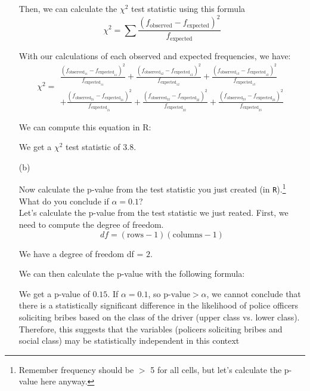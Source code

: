 \documentclass[12pt,letterpaper]{article}
\begin{document}
\begin{enumerate}
	 Then, we can calculate the $\chi^2$ test statistic using this formula
	 \[
	 \chi^2 = \sum \frac{(f_{\text{observed}} - f_{\text{expected}})^2}{f_{\text{expected}}}
	 \]
	 
	
	With our calculations of each observed and expected frequencies, we have:
	\[
	\chi^2 = 
	\begin{split}
		\frac{(f_{\text{observed}_{11}} - f_{\text{expected}_{11}})^2}{f_{\text{expected}_{11}}} 
		+ \frac{(f_{\text{observed}_{12}} - f_{\text{expected}_{12}})^2}{f_{\text{expected}_{12}}} 
		+ \frac{(f_{\text{observed}_{13}} - f_{\text{expected}_{13}})^2}{f_{\text{expected}_{13}}} \\
		+ \frac{(f_{\text{observed}_{21}} - f_{\text{expected}_{21}})^2}{f_{\text{expected}_{21}}} 
		+ \frac{(f_{\text{observed}_{22}} - f_{\text{expected}_{22}})^2}{f_{\text{expected}_{22}}} 
		+ \frac{(f_{\text{observed}_{23}} - f_{\text{expected}_{23}})^2}{f_{\text{expected}_{23}}} 
	\end{split}
	\]
	

	 We can compute this equation in R:
	 
	 
	 We get a  $\chi^2$ test statistic of  \(3.8\). 
	
	\vspace{1cm}
	\item [(b)]
	
	Now calculate the p-value from the test statistic you just created (in \texttt{R}).\footnote{Remember frequency should be $>$ 5 for all cells, but let's calculate the p-value here anyway.}  What do you conclude if $\alpha = 0.1$?\\
	
	Let's calculate the p-value from the test statistic we just reated.
	First, we need to compute the degree of freedom.
	\[
	df = (\text{rows} - 1)(\text{columns} - 1)
	\]
	

	
	We have a degree of freedom df = \(2\).
	
		
	We can then calculate the p-value with the following formula:
	

	
	We get a p-value of  \(0.15\). If  \(\alpha = 0.1\), so \( \text{p-value} > \alpha \), we cannot conclude that there is a statistically significant difference in the likelihood of police officers soliciting bribes based on the class of the driver (upper class vs. lower class). Therefore, this suggests that the variables (policers soliciting bribes and social class) may be statistically independent in this context
	

\end{enumerate}
\end{document}
